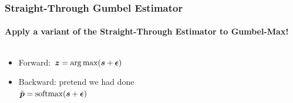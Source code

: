 \begin{frame}%
\frametitle{Straight-Through Gumbel Estimator}%
\framesubtitle{\small Apply a variant of the Straight-Through Estimator to Gumbel-Max!}
\centering
\begin{columns}[T]
\begin{column}{.4\textwidth}
\begin{itemize}
    \item<2->Forward: %
    $\boldsymbol{z} = \operatorname*{arg\,max}(\boldsymbol{s} + \boldsymbol{\epsilon})$
    \item<3->Backward: pretend we had done \\
    $\tilde{\boldsymbol{p}} = \operatorname*{softmax}(\boldsymbol{s} + \boldsymbol{\epsilon})$
\end{itemize}
\end{column}
\begin{column}{.6\textwidth}
\end{column}
\end{columns}
\end{frame}


